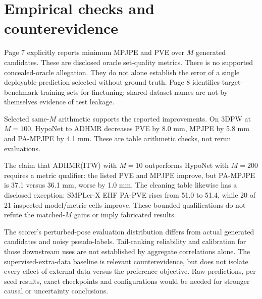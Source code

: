 \documentclass[10pt]{article}
\begin{document}
\section*{Empirical checks and counterevidence}
Page 7 explicitly reports minimum MPJPE and PVE over \(M\) generated candidates. These are disclosed oracle set-quality metrics. There is no supported concealed-oracle allegation. They do not alone establish the error of a single deployable prediction selected without ground truth. Page 8 identifies target-benchmark training sets for finetuning; shared dataset names are not by themselves evidence of test leakage.\par
Selected same-\(M\) arithmetic supports the reported improvements. On 3DPW at \(M=100\), HypoNet to ADHMR decreases PVE by 8.0 mm, MPJPE by 5.8 mm and PA-MPJPE by 4.1 mm. These are table arithmetic checks, not rerun evaluations.\par
The claim that ADHMR(ITW) with \(M=10\) outperforms HypoNet with \(M=200\) requires a metric qualifier: the listed PVE and MPJPE improve, but PA-MPJPE is 37.1 versus 36.1 mm, worse by 1.0 mm. The cleaning table likewise has a disclosed exception: SMPLer-X EHF PA-PVE rises from 51.0 to 51.4, while 20 of 21 inspected model/metric cells improve. These bounded qualifications do not refute the matched-\(M\) gains or imply fabricated results.\par
The scorer’s perturbed-pose evaluation distribution differs from actual generated candidates and noisy pseudo-labels. Tail-ranking reliability and calibration for those downstream uses are not established by aggregate correlations alone. The supervised-extra-data baseline is relevant counterevidence, but does not isolate every effect of external data versus the preference objective. Raw predictions, per-seed results, exact checkpoints and configurations would be needed for stronger causal or uncertainty conclusions.\par
\end{document}
